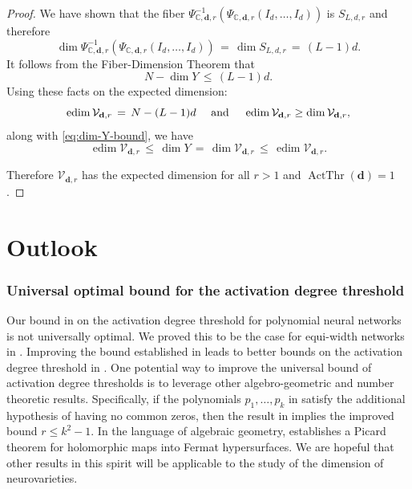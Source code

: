 \documentclass[12pt]{article}
\theoremstyle{definition}
\DeclareMathOperator{\ActThr}{ActThr}
\newcommand{\complexPsiMap}{\Psi_{{\mathbb{C},\mathbf{d},r}}}
\newcommand{\edim}[1]{\operatorname{edim}{#1}}
\renewcommand{\dim}[1]{\operatorname{dim}{#1}}
\begin{document}
\begin{proof}
We have shown that 
the fiber $\complexPsiMap^{-1}(\complexPsiMap(I_d,\dotsc,I_d))$
is $S_{L,d,r}$ and therefore 
\[
\dim{
    \complexPsiMap^{-1}(\complexPsiMap(I_d,\dotsc,I_d))
    }
    \,=\,
\dim{
    S_{L,d,r}
    }
    \,=\,
    (L-1)d.
\]
It follows from the
 Fiber-Dimension Theorem
 \cite[Theorem~1.25, Part (i)]{Shafarevich-Hirsch} that
\begin{equation}\label{eq:dim-Y-bound}
    N - \dim{Y} 
    \,\leq\, (L-1)d.
\end{equation}
%
Using these facts on the expected dimension:  
\[
\edim{\mathcal{V}_{\mathbf{d},r}} \,=\,N-(L-1)d\text{ \quad and \quad  }\edim{\mathcal{V}_{\mathbf{d},r}}\geq \dim{\mathcal{V}_{\mathbf{d},r}},
\]
along with \eqref{eq:dim-Y-bound},
we have
\begin{equation}\label{eq:dimY-equals-edim}
    \edim{\mathcal{V}_{\mathbf{d},r}} \,\leq\, \dim{Y}\,=\,\dim{\mathcal{V}_{\mathbf{d},r}}\,\leq \,\edim{\mathcal{V}_{\mathbf{d},r}}.  
\end{equation}


Therefore $\mathcal{V}_{\mathbf{d},r}$ has the expected dimension for all $r>1$ and $\ActThr(\mathbf{d}) = 1$.
\end{proof}


\section{Outlook}\label{s:future}

\subsubsection*{Universal optimal bound for the activation degree threshold}

Our bound in   on the activation degree threshold for polynomial neural networks is not universally optimal. 
We proved this to be the case for equi-width networks in .  
Improving the bound established in  leads to better bounds on the activation degree threshold in .
One potential way to improve the universal bound of activation degree thresholds is to leverage other algebro-geometric and number theoretic results. 
Specifically, if the polynomials $p_1,\dotsc,p_k$ in  satisfy the additional hypothesis of having no common zeros, then the result in \cite[page 71]{G1975} implies the improved bound $r\leq k^2- 1$. In the language of algebraic geometry, \cite[page 71]{G1975}  establishes a Picard theorem for holomorphic maps into Fermat hypersurfaces. 
We are hopeful 
that other results in this spirit will be applicable to the study of the dimension of neurovarieties.
\end{document}
